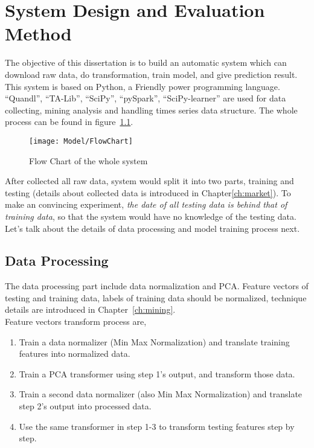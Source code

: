 \chapter{System Design and Evaluation Method}
\label{ch:system}

The objective of this dissertation is to build an automatic system which can download raw data, do transformation, train model, and give prediction result. This system is based on Python, a Friendly power programming language. “Quandl”, “TA-Lib”, “SciPy”, “pySpark”, “SciPy-learner” are used for data collecting, mining analysis and handling times series data structure. The whole process can be found in figure~\ref{fg:system_model}.
\begin{figure}[h]
	\centering
	\texttt{[image: Model/FlowChart]}
	\caption{Flow Chart of the whole system}
	\label{fg:system_model}
\end{figure}

After collected all raw data, system would split it into two parts, training and testing (details about collected data is introduced in Chapter\ref{ch:market}). To make an convincing experiment, \emph{the date of all testing data is behind that of training data}, so that the system would have no knowledge of the testing data. Let's talk about the details of data processing and model training process next.\\


\section{Data Processing}
The data processing part include data normalization and PCA. Feature vectors of testing and training data, labels of training data should be normalized, technique details are introduced in Chapter~\ref{ch:mining}.\\


Feature vectors transform process are,
\begin{enumerate}
	\item Train a data normalizer (Min Max Normalization) and translate training features into normalized data.
	\item Train a PCA transformer using step 1's output, and transform those data.
	\item Train a second data normalizer (also Min Max Normalization) and translate step 2's output into processed data.
	\item Use the same transformer in step 1-3 to transform testing features step by step.
\end{enumerate}

